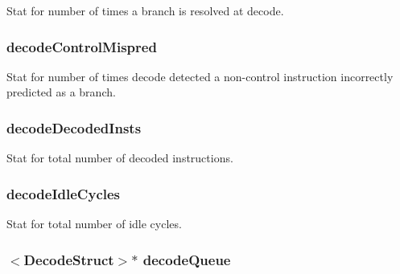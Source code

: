 \label{classDefaultDecode_a85271ddee50df718b95448a65de49f4f}
Stat for number of times a branch is resolved at decode. \hypertarget{classDefaultDecode_ac6135ce194bbd50f851f71e0e6049464}{
\subsubsection[{decodeControlMispred}]{ {\bf decodeControlMispred}}}
\label{classDefaultDecode_ac6135ce194bbd50f851f71e0e6049464}
Stat for number of times decode detected a non-\/control instruction incorrectly predicted as a branch. \hypertarget{classDefaultDecode_a2ac1cd5e0cbce47426a97fba4bb966dc}{
\subsubsection[{decodeDecodedInsts}]{ {\bf decodeDecodedInsts}}}
\label{classDefaultDecode_a2ac1cd5e0cbce47426a97fba4bb966dc}
Stat for total number of decoded instructions. \hypertarget{classDefaultDecode_a1037bebd5ca3880affa4633d03176747}{
\subsubsection[{decodeIdleCycles}]{ {\bf decodeIdleCycles}}}
\label{classDefaultDecode_a1037bebd5ca3880affa4633d03176747}
Stat for total number of idle cycles. \hypertarget{classDefaultDecode_a7860fc5736574343c9e294cb2bef9d93}{
\subsubsection[{decodeQueue}]{$<${\bf DecodeStruct}$>$$\ast$ {\bf decodeQueue}}}
